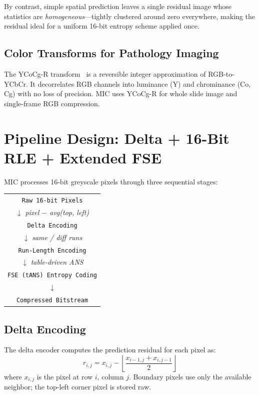 \documentclass[10pt,twocolumn]{article}
\begin{document}
By contrast, simple spatial prediction leaves a single residual image whose statistics are \emph{homogeneous}---tightly clustered around zero everywhere, making the residual ideal for a uniform 16-bit entropy scheme applied once.

\subsection{Color Transforms for Pathology Imaging}

The YCoCg-R transform~\cite{ycocgr} is a reversible integer approximation of RGB-to-YCbCr. It decorrelates RGB channels into luminance (Y) and chrominance (Co, Cg) with no loss of precision. MIC uses YCoCg-R for whole slide image and single-frame RGB compression.

\section{Pipeline Design: Delta + 16-Bit RLE + Extended FSE}
\label{sec:pipeline}

MIC processes 16-bit greyscale pixels through three sequential stages:
\begin{center}
\small
\begin{tabular}{c}
\texttt{Raw 16-bit Pixels}\\
$\downarrow$ \textit{pixel $-$ avg(top, left)}\\
\texttt{Delta Encoding}\\
$\downarrow$ \textit{same / diff runs}\\
\texttt{Run-Length Encoding}\\
$\downarrow$ \textit{table-driven ANS}\\
\texttt{FSE (tANS) Entropy Coding}\\
$\downarrow$\\
\texttt{Compressed Bitstream}\\
\end{tabular}
\end{center}

\subsection{Delta Encoding}

The delta encoder computes the prediction residual for each pixel as:
\begin{equation}
  r_{i,j} = x_{i,j} - \left\lfloor \frac{x_{i-1,j} + x_{i,j-1}}{2} \right\rfloor
\end{equation}
where $x_{i,j}$ is the pixel at row $i$, column $j$. Boundary pixels use only the available neighbor; the top-left corner pixel is stored raw.
\end{document}
